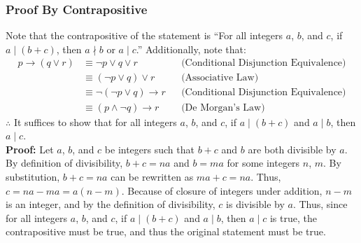 \documentclass[table]{article}
\begin{document}
\subsubsection{Proof By Contrapositive}
Note that the contrapositive of the statement is ``For all integers $a$, $b$, and $c$, if $a \mid (b + c)$, then $a \nmid b$ or $a \mid c$.'' Additionally, note that:
\begin{align*}
p \rightarrow (q \lor r) &\equiv \neg p \lor q \lor r && \text{(Conditional Disjunction Equivalence)}\\
&\equiv (\neg p \lor q) \lor r && \text{(Associative Law)}\\
&\equiv \neg (\neg p \lor q) \rightarrow r && \text{(Conditional Disjunction Equivalence)}\\
&\equiv (p \land \neg q) \rightarrow r && \text{(De Morgan's Law)}
\end{align*}
$\therefore$ It suffices to show that for all integers $a$, $b$, and $c$, if $a \mid (b+c)$ and $a \mid b$, then $a \mid c$.\\
\textbf{Proof:} Let $a$, $b$, and $c$ be integers such that $b+c$ and $b$ are both divisible by $a$. By definition of divisibility, $b + c = na$ and $b = ma$ for some integers $n$, $m$. By substitution, $b + c = na$ can be rewritten as $ma + c = na$. Thus, $c = na - ma = a(n - m)$. Because of closure of integers under addition, $n - m$ is an integer, and by the definition of divisibility, $c$ is divisible by $a$. Thus, since for all integers $a$, $b$, and $c$, if $a \mid (b+c)$ and $a \mid b$, then $a \mid c$ is true, the contrapositive must be true, and thus the original statement must be true.
\end{document}
